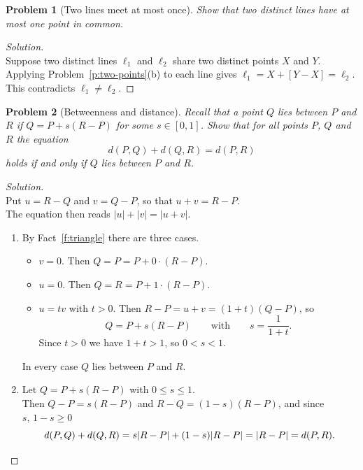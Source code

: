 \documentclass[11pt,a4paper]{article}
\theoremstyle{boxed}
\newtheorem{problem}{Problem}
\theoremstyle{definition}
\newenvironment{solution}{\begin{proof}[Solution]}{\end{proof}}
\newcommand{\abs}[1]{\lvert #1 \rvert}
\begin{document}
\newpage
\begin{problem}[Two lines meet at most once]\label{p:meet-once}
Show that two distinct lines have at most one point in common.
\end{problem}

\begin{solution}
\leavevmode\\
Suppose two distinct lines $\ell_1$ and $\ell_2$ share two distinct points $X$ and $Y$.\\
Applying Problem~\ref{p:two-points}(b) to each line gives $\ell_1=X+[Y-X]=\ell_2$.\\
This contradicts $\ell_1\neq\ell_2$.
\end{solution}

\begin{problem}[Betweenness and distance]\label{p:between}
Recall that a point $Q$ lies between $P$ and $R$ if $Q=P+s(R-P)$ for some $s\in[0,1]$.
Show that for all points $P$, $Q$ and $R$ the equation
\[
d(P,Q)+d(Q,R)=d(P,R)
\]
holds if and only if $Q$ lies between $P$ and $R$.
\end{problem}

\begin{solution}
\leavevmode\\
Put $u=R-Q$ and $v=Q-P$, so that $u+v=R-P$.\\
The equation then reads $\abs{u}+\abs{v}=\abs{u+v}$.
\begin{enumerate}[leftmargin=2.5em]
    \item[($\Rightarrow$)] By Fact~\ref{f:triangle} there are three cases.
    \begin{itemize}[nosep]
        \item $v=0$. Then $Q=P=P+0\cdot(R-P)$.
        \item $u=0$. Then $Q=R=P+1\cdot(R-P)$.
        \item $u=tv$ with $t>0$. Then $R-P=u+v=(1+t)(Q-P)$, so
        \[
        Q=P+s(R-P) \qquad\text{with}\qquad s=\frac{1}{1+t}.
        \]
        Since $t>0$ we have $1+t>1$, so $0<s<1$.
    \end{itemize}
    In every case $Q$ lies between $P$ and $R$.
    \item[($\Leftarrow$)] Let $Q=P+s(R-P)$ with $0\le s\le1$.\\
    Then $Q-P=s(R-P)$ and $R-Q=(1-s)(R-P)$, and since $s,\,1-s\ge0$
    \[
    d(P,Q)+d(Q,R)=s\abs{R-P}+(1-s)\abs{R-P}=\abs{R-P}=d(P,R). \qedhere
    \]
\end{enumerate}
\end{solution}
\end{document}

